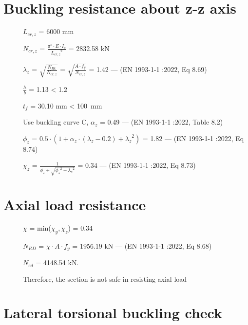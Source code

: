 \documentclass[
  letterpaper,
  DIV=11,
  numbers=noendperiod]{scrartcl}
\begin{document}
\section{Buckling resistance about z-z
axis}\label{buckling-resistance-about-z-z-axis}

\begin{description}
  \item[]$L_{cr,z}$ = 6000 mm
  \item[]$N_{cr,z}$ = $\frac{\pi^{2}\cdot E\cdot I_{z}}{{L_{cr,z}}^{2}}$ = 2832.58 kN
  \item[]$\lambda_{z}$ = $\sqrt{\frac{N_{Rk}}{N_{cr,z}}}$ = $\sqrt{\frac{A\cdot f_{y}}{N_{cr,z}}}$ = 1.42 --- (EN 1993-1-1 :2022, Eq 8.69)
  \item[]$\frac{h}{b}$ = 1.13 < 1.2
  \item[]$t_{f}$ = 30.10 mm < 100~mm
  \item[]Use buckling curve C,  $\alpha_{z}$ = 0.49 --- (EN 1993-1-1 :2022, Table 8.2)
  \item[]$\phi_{z}$ = $0.5 \cdot (1 + \alpha_{z} \cdot (\lambda_{z} - 0.2) + {\lambda_{z}}^{2})$ = 1.82 --- (EN 1993-1-1 :2022, Eq 8.74)
  \item[]$\chi_{z}$ = $\frac{1}{\phi_{z} + \sqrt{{\phi_{z}}^{2} - {\lambda_{z}}^{2}}}$ = 0.34 --- (EN 1993-1-1 :2022, Eq 8.73)
  
\end{description}

\section{Axial load resistance}\label{axial-load-resistance}

\begin{description}
  \item[]$\chi$ = min($\chi_{y},\chi_{z}$) = 0.34
  \item[]$N_{RD}$ = $\chi\cdot A\cdot f_{y}$ = 1956.19 kN --- (EN 1993-1-1 :2022, Eq 8.68)
  \item[]$N_{ed}$ = 4148.54 kN.
  \item[]Therefore, the section is not safe in resisting axial load
\end{description}

\newpage{}

\section{}\label{section-11}

\section{Lateral torsional buckling
check}\label{lateral-torsional-buckling-check}
\end{document}
